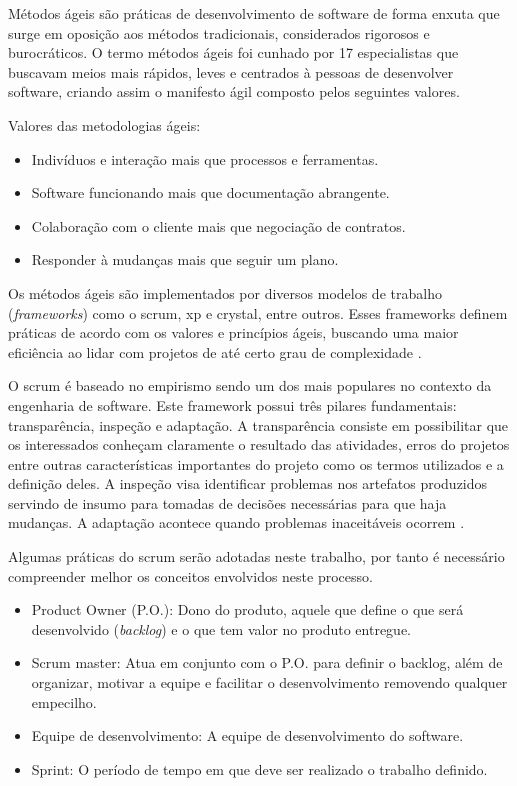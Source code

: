 Métodos ágeis são práticas de desenvolvimento de software de forma enxuta que surge em oposição aos métodos tradicionais, considerados rigorosos e burocráticos. O termo métodos ágeis foi cunhado por 17 especialistas que buscavam meios mais rápidos, leves e centrados à pessoas de desenvolver software, criando assim o manifesto ágil composto pelos seguintes valores.

Valores das metodologias ágeis:
\begin{itemize}
	\item Indivíduos e interação mais que processos e ferramentas.
	\item Software funcionando mais que documentação abrangente.
	\item Colaboração com o cliente mais que negociação de contratos.
	\item Responder à mudanças mais que seguir um plano.
\end{itemize}

Os métodos ágeis são implementados por diversos modelos de trabalho (\textit{frameworks}) como o scrum, xp e crystal, entre outros. Esses frameworks definem práticas de acordo com os valores e princípios ágeis, buscando uma maior eficiência ao lidar com projetos de até certo grau de complexidade \cite{prik2014}.

O scrum é baseado no empirismo sendo um dos mais populares no contexto da engenharia de software. Este framework possui três pilares fundamentais: transparência, inspeção e adaptação. A transparência consiste em possibilitar que os interessados conheçam claramente o resultado das atividades, erros do projetos entre outras características importantes do projeto como os termos utilizados e a definição deles. A inspeção visa identificar problemas nos artefatos produzidos servindo de insumo para tomadas de decisões necessárias para que haja mudanças. A adaptação acontece quando problemas inaceitáveis ocorrem \cite{scrum2014}.

Algumas práticas do scrum serão adotadas neste trabalho, por tanto é necessário compreender melhor os conceitos envolvidos neste processo.

\begin{itemize}
	\item Product Owner (P.O.): Dono do produto, aquele que define o que será desenvolvido (\textit{backlog}) e o que tem valor no produto entregue.
	\item Scrum master: Atua em conjunto com o P.O. para definir o backlog, além de organizar, motivar a equipe e facilitar o desenvolvimento removendo qualquer empecilho.
	\item Equipe de desenvolvimento: A equipe de desenvolvimento do software.
	\item Sprint: O período de tempo em que deve ser realizado o trabalho definido.
\end{itemize}

